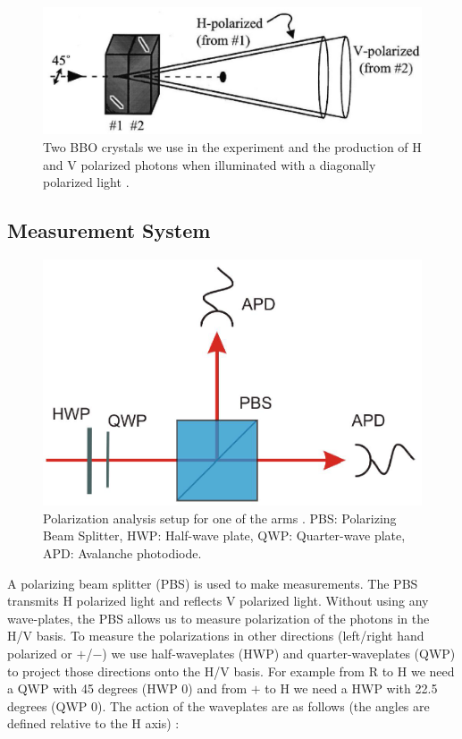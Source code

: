 \begin{figure}[htp]
    \centering
    \includegraphics[scale = 0.6]{figures/bbo.png}
    \caption{Two BBO crystals we use in the experiment and the production of H and V polarized photons when illuminated with a diagonally polarized light \cite{manual}.}
    \label{fig:bbo}
\end{figure} 

\newpage

\subsection{Measurement System}
\label{subsec:measurement_system}
\begin{figure}[htp]
    \centering
    \includegraphics[scale = 0.6]{figures/apd.png}
    \caption{Polarization analysis setup for one of the arms \cite{manual}. PBS: Polarizing Beam Splitter, HWP: Half-wave plate, QWP: Quarter-wave plate, APD: Avalanche photodiode.}
    \label{fig:apd}
\end{figure} 
A polarizing beam splitter (PBS) is used to make measurements. The PBS transmits H polarized light and reflects V polarized light. Without using any wave-plates, the PBS allows us to measure polarization of the photons in the H/V basis. To measure the polarizations in other directions (left/right hand polarized or $+$/$-$) we use half-waveplates (HWP) and quarter-waveplates (QWP) to project those directions onto the H/V basis. For example from R to H we need a QWP with 45 degrees (HWP 0) and from $+$ to H we need a HWP with 22.5 degrees (QWP 0). The action of the waveplates are as follows (the angles are defined relative to the H axis) :

